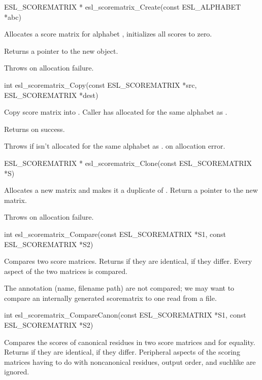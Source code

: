 \begin{sreapi}
\hypertarget{func:esl_scorematrix_Create()}
{\item[ESL\_SCOREMATRIX * esl\_scorematrix\_Create(const ESL\_ALPHABET *abc)]}

Allocates a score matrix for alphabet , initializes
all scores to zero.

Returns a pointer to the new object.

Throws  on allocation failure.


\hypertarget{func:esl_scorematrix_Copy()}
{\item[int esl\_scorematrix\_Copy(const ESL\_SCOREMATRIX *src, ESL\_SCOREMATRIX *dest)]}

Copy  score matrix into . Caller
has allocated  for the same alphabet as
.

Returns  on success.

Throws  if  isn't allocated for
the same alphabet as .
 on allocation error.


\hypertarget{func:esl_scorematrix_Clone()}
{\item[ESL\_SCOREMATRIX * esl\_scorematrix\_Clone(const ESL\_SCOREMATRIX *S)]}

Allocates a new matrix and makes it a duplicate
of . Return a pointer to the new matrix.

Throws  on allocation failure.


\hypertarget{func:esl_scorematrix_Compare()}
{\item[int esl\_scorematrix\_Compare(const ESL\_SCOREMATRIX *S1, const ESL\_SCOREMATRIX *S2)]}

Compares two score matrices. Returns  if they 
are identical,  if they differ. Every aspect
of the two matrices is compared.

The annotation (name, filename path) are not
compared; we may want to compare an internally
generated scorematrix to one read from a file.


\hypertarget{func:esl_scorematrix_CompareCanon()}
{\item[int esl\_scorematrix\_CompareCanon(const ESL\_SCOREMATRIX *S1, const ESL\_SCOREMATRIX *S2)]}

Compares the scores of canonical residues in 
two score matrices  and  for equality.
Returns  if they are identical,  
if they differ. Peripheral aspects of the scoring matrices
having to do with noncanonical residues, output
order, and suchlike are ignored.



\end{sreapi}
